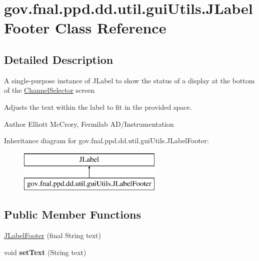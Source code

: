 \hypertarget{classgov_1_1fnal_1_1ppd_1_1dd_1_1util_1_1guiUtils_1_1JLabelFooter}{\section{gov.\-fnal.\-ppd.\-dd.\-util.\-gui\-Utils.\-J\-Label\-Footer Class Reference}
\label{classgov_1_1fnal_1_1ppd_1_1dd_1_1util_1_1guiUtils_1_1JLabelFooter}
}


\subsection{Detailed Description}
A single-\/purpose instance of J\-Label to show the status of a display at the bottom of the \hyperlink{classgov_1_1fnal_1_1ppd_1_1dd_1_1ChannelSelector}{Channel\-Selector} screen 

Adjusts the text within the label to fit in the provided space. 

\begin{DoxyAuthor}{Author}
Elliott Mc\-Crory, Fermilab A\-D/\-Instrumentation 
\end{DoxyAuthor}
Inheritance diagram for gov.\-fnal.\-ppd.\-dd.\-util.\-gui\-Utils.\-J\-Label\-Footer\-:\begin{figure}[H]
\begin{center}
\leavevmode
\includegraphics[height=2.000000cm]{classgov_1_1fnal_1_1ppd_1_1dd_1_1util_1_1guiUtils_1_1JLabelFooter}
\end{center}
\end{figure}
\subsection*{Public Member Functions}
\begin{DoxyCompactItemize}
\item 
\hyperlink{classgov_1_1fnal_1_1ppd_1_1dd_1_1util_1_1guiUtils_1_1JLabelFooter_aa9d75e5757c4c2e8625c7c2cf54bef17}{J\-Label\-Footer} (final String text)
\item 
\hypertarget{classgov_1_1fnal_1_1ppd_1_1dd_1_1util_1_1guiUtils_1_1JLabelFooter_ab0c1cc40ed25b7af9eea15b8e3f34ac6}{void {\bfseries set\-Text} (String text)}\label{classgov_1_1fnal_1_1ppd_1_1dd_1_1util_1_1guiUtils_1_1JLabelFooter_ab0c1cc40ed25b7af9eea15b8e3f34ac6}

\end{DoxyCompactItemize}


